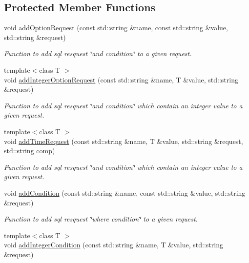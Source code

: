 \subsection*{Protected Member Functions}
\begin{DoxyCompactItemize}
\item 
void \hyperlink{classQueryServer_a908157c12cbf775d0dd7f270e0f291fe}{addOptionRequest} (const std::string \&name, const std::string \&value, std::string \&request)
\begin{DoxyCompactList}\small\item\em Function to add sql resquest \char`\"{}and condition\char`\"{} to a given request. \item\end{DoxyCompactList}\item 
{\footnotesize template$<$class T $>$ }\\void \hyperlink{classQueryServer_a468ed7f1ccfa3905d010ad67948ea28d}{addIntegerOptionRequest} (const std::string \&name, T \&value, std::string \&request)
\begin{DoxyCompactList}\small\item\em Function to add sql resquest \char`\"{}and condition\char`\"{} which contain an integer value to a given request. \item\end{DoxyCompactList}\item 
{\footnotesize template$<$class T $>$ }\\void \hyperlink{classQueryServer_a43a6aa8774b5a781bb3c5777eb557a24}{addTimeRequest} (const std::string \&name, T \&value, std::string \&request, std::string comp)
\begin{DoxyCompactList}\small\item\em Function to add sql resquest \char`\"{}and condition\char`\"{} which contain an integer value to a given request. \item\end{DoxyCompactList}\item 
void \hyperlink{classQueryServer_ae560033d0f8aac38f1feaa59f37305c8}{addCondition} (const std::string \&name, const std::string \&value, std::string \&request)
\begin{DoxyCompactList}\small\item\em Function to add sql resquest \char`\"{}where condition\char`\"{} to a given request. \item\end{DoxyCompactList}\item 
{\footnotesize template$<$class T $>$ }\\void \hyperlink{classQueryServer_afdb77d4186ae47e469a1eb19bc8a7722}{addIntegerCondition} (const std::string \&name, T \&value, std::string \&request)

\end{DoxyCompactItemize}
